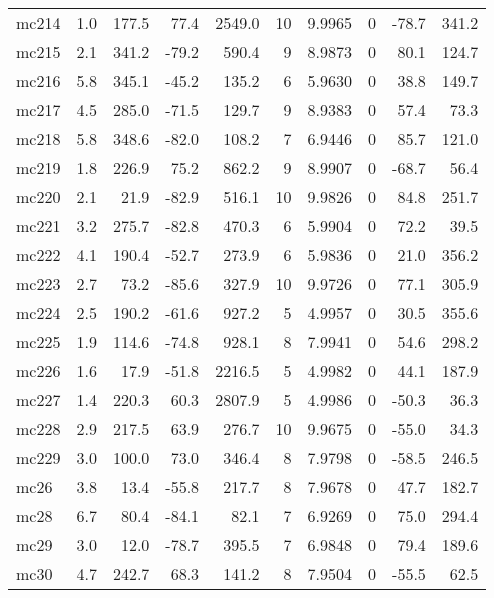 \documentclass{article}
\begin{document}
\begin{longtable}{lrrrrrrrrr}
 mc214 &  1.0 &  177.5 &  77.4 &  2549.0 &  10 &   9.9965 &       0 &    -78.7 &     341.2 \\
 mc215 &  2.1 &  341.2 & -79.2 &   590.4 &   9 &   8.9873 &       0 &     80.1 &     124.7 \\
 mc216 &  5.8 &  345.1 & -45.2 &   135.2 &   6 &   5.9630 &       0 &     38.8 &     149.7 \\
 mc217 &  4.5 &  285.0 & -71.5 &   129.7 &   9 &   8.9383 &       0 &     57.4 &      73.3 \\
 mc218 &  5.8 &  348.6 & -82.0 &   108.2 &   7 &   6.9446 &       0 &     85.7 &     121.0 \\
 mc219 &  1.8 &  226.9 &  75.2 &   862.2 &   9 &   8.9907 &       0 &    -68.7 &      56.4 \\
 mc220 &  2.1 &   21.9 & -82.9 &   516.1 &  10 &   9.9826 &       0 &     84.8 &     251.7 \\
 mc221 &  3.2 &  275.7 & -82.8 &   470.3 &   6 &   5.9904 &       0 &     72.2 &      39.5 \\
 mc222 &  4.1 &  190.4 & -52.7 &   273.9 &   6 &   5.9836 &       0 &     21.0 &     356.2 \\
 mc223 &  2.7 &   73.2 & -85.6 &   327.9 &  10 &   9.9726 &       0 &     77.1 &     305.9 \\
 mc224 &  2.5 &  190.2 & -61.6 &   927.2 &   5 &   4.9957 &       0 &     30.5 &     355.6 \\
 mc225 &  1.9 &  114.6 & -74.8 &   928.1 &   8 &   7.9941 &       0 &     54.6 &     298.2 \\
 mc226 &  1.6 &   17.9 & -51.8 &  2216.5 &   5 &   4.9982 &       0 &     44.1 &     187.9 \\
 mc227 &  1.4 &  220.3 &  60.3 &  2807.9 &   5 &   4.9986 &       0 &    -50.3 &      36.3 \\
 mc228 &  2.9 &  217.5 &  63.9 &   276.7 &  10 &   9.9675 &       0 &    -55.0 &      34.3 \\
 mc229 &  3.0 &  100.0 &  73.0 &   346.4 &   8 &   7.9798 &       0 &    -58.5 &     246.5 \\
  mc26 &  3.8 &   13.4 & -55.8 &   217.7 &   8 &   7.9678 &       0 &     47.7 &     182.7 \\
  mc28 &  6.7 &   80.4 & -84.1 &    82.1 &   7 &   6.9269 &       0 &     75.0 &     294.4 \\
  mc29 &  3.0 &   12.0 & -78.7 &   395.5 &   7 &   6.9848 &       0 &     79.4 &     189.6 \\
  mc30 &  4.7 &  242.7 &  68.3 &   141.2 &   8 &   7.9504 &       0 &    -55.5 &      62.5 \\

\end{longtable}
\end{document}
